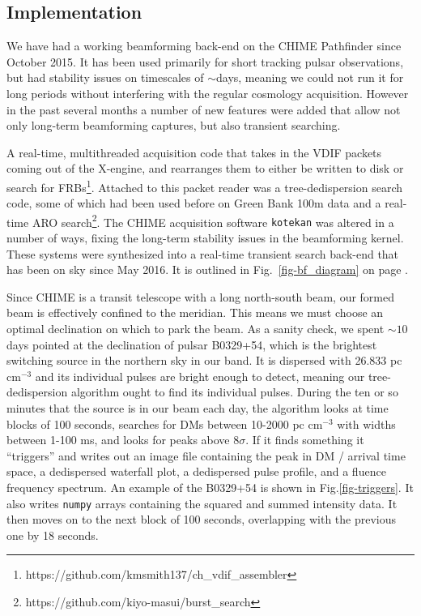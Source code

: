 \subsection{Implementation}

We have had a working beamforming back-end on the CHIME 
Pathfinder since October 2015. It has been used primarily 
for short tracking pulsar observations, but had stability issues 
on timescales of $\sim$days, meaning we could not run it 
for long periods without interfering with the regular cosmology acquisition. 
However in the past several months a number of new features 
were added that allow not only long-term beamforming captures, 
but also transient searching. 
 
A real-time, multithreaded acquisition code that takes in the VDIF 
packets coming out of the X-engine, and rearranges them to either be written to disk or search for 
FRBs\footnote{https://github.com/kmsmith137/ch\_vdif\_assembler}. Attached 
to this packet reader was a tree-dedispersion search code, some of 
which had been used before on Green Bank 100m data and a real-time ARO 
search\footnote{https://github.com/kiyo-masui/burst\_search}.
The CHIME acquisition software {\tt kotekan} was 
altered in a number of ways, fixing the long-term 
stability issues in the beamforming kernel. These systems 
were synthesized into a real-time transient search back-end 
that has been on sky since May 2016. 
It is outlined in Fig.~\ref{fig-bf_diagram}
on page \pageref{fig-bf_diagram}. 

Since CHIME is a transit telescope with a long north-south beam, 
our formed beam is effectively confined to the meridian. This means
we must choose an optimal declination on which 
to park the beam. As a sanity check, we spent $\sim10$ 
days pointed 
at the declination of pulsar B0329+54, which is the 
brightest switching source in the northern sky in our band. It 
is dispersed with 26.833 pc cm$^{-3}$ and its individual 
pulses are bright enough to detect, meaning our tree-dedispersion 
algorithm ought to find its individual pulses. During the 
ten or so minutes that the source is in our beam each day, 
the algorithm looks at time blocks of 100 seconds, searches 
for DMs between 10-2000 pc cm$^{-3}$ with widths between 
1-100 ms, and looks for peaks above 8$\sigma$. If it finds something
it ``triggers'' and writes out an image file containing the peak 
in DM / arrival time space, a dedispersed waterfall plot, a dedispersed 
pulse profile, and a fluence frequency spectrum. An example 
of the B0329+54 is shown in Fig.\ref{fig-triggers}. It also 
writes {\tt numpy} arrays containing the squared and summed 
intensity data. It then moves on to the next block of 100 seconds, 
overlapping with the previous one by 18 seconds. 







